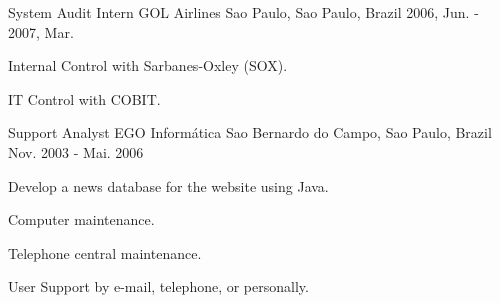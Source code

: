 \begin{cventries}
  \cventry
    {System Audit Intern} %
    {GOL Airlines} %
    {Sao Paulo, Sao Paulo, Brazil} %
    {2006, Jun. - 2007, Mar.} %
    {
          \begin{cvitems} %
            \item {Internal Control with Sarbanes-Oxley (SOX).}
            \item {IT Control with COBIT.}
          \end{cvitems}
    }

  \cventry
    {Support Analyst} %
    {EGO Informática} %
    {Sao Bernardo do Campo, Sao Paulo, Brazil} %
    {Nov. 2003 - Mai. 2006} %
    {
          \begin{cvitems} %
            \item {Develop a news database for the website using Java.}
            \item {Computer maintenance.}
            \item {Telephone central maintenance.}
            \item {User Support by e-mail, telephone, or personally.}
          \end{cvitems}
    }

\end{cventries}

